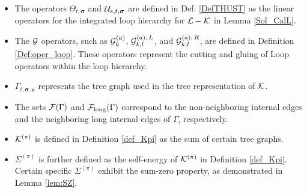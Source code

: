 \documentclass[10pt,reqno]{article}
\theoremstyle{plain} %
\theoremstyle{remark}
\numberwithin{equation}{section}
\begin{document}
\begin{itemize}
    \begin{align}
\Xi^{({\cal L})}_{t, m}&:= \max_{\boldsymbol{\sigma}, \textbf{a}} 
\left|{\cal L}_{t, \boldsymbol{\sigma}, \textbf{a}} \right|\cdot \left(W\ell_t \eta_t\right)^{m-1} \cdot {\bf 1}(\boldsymbol{\sigma} \in \{+,-\}^m),
\nonumber \\
\Xi^{({\cal L-K})}_{t, m}&:= \max_{\boldsymbol{\sigma}, \textbf{a}}
\left|{ ({\cal L-K})}_{t, \boldsymbol{\sigma}, \textbf{a}} \right|\cdot \left(W\ell_t \eta_t\right)^{m }\cdot {\bf 1}(\boldsymbol{\sigma} \in \{+,-\}^m) ,
\nonumber \\
\Xi^{({{\cal C},\;diag })}_{t, m} &:= \max_{\boldsymbol{\sigma}, \textbf{a}} \max_i \left|\left({\cal C}^{(m)}_{t, \boldsymbol{\sigma}, \textbf{a}}\right)_{ii}\right| \cdot \left(W\ell_t \eta_t\right)^{m-1} \cdot {\bf 1}(\boldsymbol{\sigma} \in \{+,-\}^m), \nonumber \\
\Xi^{({{\cal C},\;off})}_{t, m} &:= \max_{\boldsymbol{\sigma}, \textbf{a}} \max_{i \neq j}
\left|\left({\cal C}^{(m)}_{t, \boldsymbol{\sigma}, \textbf{a}}\right)_{ij}\right| \cdot \left(W\ell_t \eta_t\right)^{m-1/2} \cdot {\bf 1}(\boldsymbol{\sigma} \in \{+,-\}^m).
\end{align}
\item The operators $\varTheta_{t,\boldsymbol{\sigma}}$ and ${\cal U}_{s, t,\boldsymbol{\sigma}}$ are defined in Def. \ref{DefTHUST} as the linear operators for the integrated loop hierarchy for $\cal L-\cal K$ in Lemma \ref{Sol_CalL}. 
\item  The \(\cal G\) operators, such as \({\cal G}^{(a)}_k\), \({\cal G}^{(a),\,L}_{k,l}\), and \({\cal G}^{(a),\,R}_{k,l}\), are defined in Definition \ref{Def:oper_loop}. These operators represent the cutting and gluing of Loop operators within the loop hierarchy.
 

\item \(\Gamma_{t,\boldsymbol{\sigma}, \textbf{a}}\) represents the tree graph used in the tree representation of \(\cal K\). 
\item  The sets \({\cal F}(\Gamma)\) and \({\cal F}_{\text{long}}(\Gamma)\) correspond to the non-neighboring internal edges and the neighboring long internal edges of $\Gamma$, respectively.

\item \({\cal K}^{(\pi)}\) is defined in Definition \ref{def_Kpi} as the sum of certain tree graphs. 
\item \(\Sigma^{(\pi)}\) is further defined as the self-energy of \({\cal K}^{(\pi)}\) in Definition \ref{def_Kpi}. Certain specific \(\Sigma^{(\pi)}\) exhibit the sum-zero property, as demonstrated in Lemma \ref{lem:SZ}.
 

\end{itemize}
\end{document}
